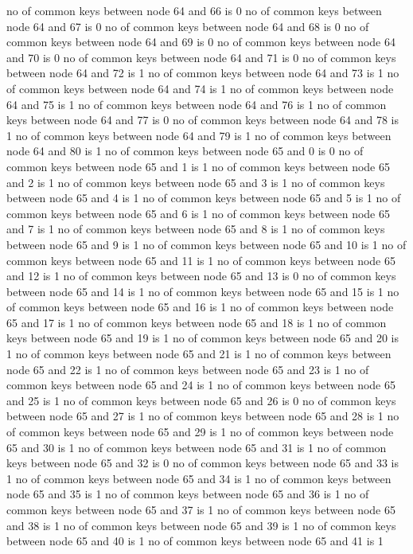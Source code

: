 no of common keys between node 64 and 66 is 0
no of common keys between node 64 and 67 is 0
no of common keys between node 64 and 68 is 0
no of common keys between node 64 and 69 is 0
no of common keys between node 64 and 70 is 0
no of common keys between node 64 and 71 is 0
no of common keys between node 64 and 72 is 1
no of common keys between node 64 and 73 is 1
no of common keys between node 64 and 74 is 1
no of common keys between node 64 and 75 is 1
no of common keys between node 64 and 76 is 1
no of common keys between node 64 and 77 is 0
no of common keys between node 64 and 78 is 1
no of common keys between node 64 and 79 is 1
no of common keys between node 64 and 80 is 1
no of common keys between node 65 and 0 is 0
no of common keys between node 65 and 1 is 1
no of common keys between node 65 and 2 is 1
no of common keys between node 65 and 3 is 1
no of common keys between node 65 and 4 is 1
no of common keys between node 65 and 5 is 1
no of common keys between node 65 and 6 is 1
no of common keys between node 65 and 7 is 1
no of common keys between node 65 and 8 is 1
no of common keys between node 65 and 9 is 1
no of common keys between node 65 and 10 is 1
no of common keys between node 65 and 11 is 1
no of common keys between node 65 and 12 is 1
no of common keys between node 65 and 13 is 0
no of common keys between node 65 and 14 is 1
no of common keys between node 65 and 15 is 1
no of common keys between node 65 and 16 is 1
no of common keys between node 65 and 17 is 1
no of common keys between node 65 and 18 is 1
no of common keys between node 65 and 19 is 1
no of common keys between node 65 and 20 is 1
no of common keys between node 65 and 21 is 1
no of common keys between node 65 and 22 is 1
no of common keys between node 65 and 23 is 1
no of common keys between node 65 and 24 is 1
no of common keys between node 65 and 25 is 1
no of common keys between node 65 and 26 is 0
no of common keys between node 65 and 27 is 1
no of common keys between node 65 and 28 is 1
no of common keys between node 65 and 29 is 1
no of common keys between node 65 and 30 is 1
no of common keys between node 65 and 31 is 1
no of common keys between node 65 and 32 is 0
no of common keys between node 65 and 33 is 1
no of common keys between node 65 and 34 is 1
no of common keys between node 65 and 35 is 1
no of common keys between node 65 and 36 is 1
no of common keys between node 65 and 37 is 1
no of common keys between node 65 and 38 is 1
no of common keys between node 65 and 39 is 1
no of common keys between node 65 and 40 is 1
no of common keys between node 65 and 41 is 1
